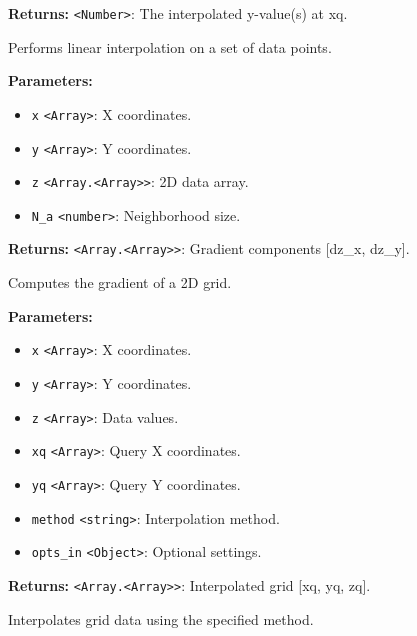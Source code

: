 \documentclass[12pt,a4paper]{article}
\begin{document}
\noindent \textbf{Returns:} \texttt{<Number>}: The interpolated y-value(s) at xq.

\noindent Performs linear interpolation on a set of data points.

\vspace{5mm}
\noindent {}


\noindent \textbf{Parameters:}
\begin{itemize}
  \item \texttt{x} \texttt{<Array>}: X coordinates.
  \item \texttt{y} \texttt{<Array>}: Y coordinates.
  \item \texttt{z} \texttt{<Array.<Array>>}: 2D data array.
  \item \texttt{N\_a} \texttt{<number>}: Neighborhood size.
\end{itemize}

\noindent \textbf{Returns:} \texttt{<Array.<Array>>}: Gradient components [dz\_x, dz\_y].

\noindent Computes the gradient of a 2D grid.

\vspace{5mm}
\noindent {}


\noindent \textbf{Parameters:}
\begin{itemize}
  \item \texttt{x} \texttt{<Array>}: X coordinates.
  \item \texttt{y} \texttt{<Array>}: Y coordinates.
  \item \texttt{z} \texttt{<Array>}: Data values.
  \item \texttt{xq} \texttt{<Array>}: Query X coordinates.
  \item \texttt{yq} \texttt{<Array>}: Query Y coordinates.
  \item \texttt{method} \texttt{<string>}: Interpolation method.
  \item \texttt{opts\_in} \texttt{<Object>}: Optional settings.
\end{itemize}

\noindent \textbf{Returns:} \texttt{<Array.<Array>>}: Interpolated grid [xq, yq, zq].

\noindent Interpolates grid data using the specified method.
\end{document}
